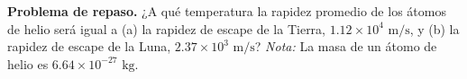 \item \textbf{Problema de repaso.} ¿A qué temperatura la rapidez promedio de los átomos de helio será igual a (a) la rapidez de escape de la Tierra, $1.12 \times 10^4\text{ m/s}$, y (b) la rapidez de escape de la Luna, $2.37 \times 10^3\text{ m/s}$? \textit{Nota:} La masa de un átomo de helio es $6.64 \times 10^{-27}\text{ kg}$.
